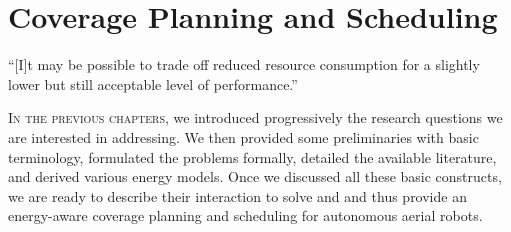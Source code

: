 
%
%
%
%
\chapter{Coverage Planning and Scheduling}
\label{cp:dyn}

\begin{chapquote}{\cite{lahijanian2018resource}}
  ``[I]t may be possible to trade off reduced resource consumption for a slightly lower but still acceptable level of performance.''
\end{chapquote}

\vspace*{1em}

\lettrine{I}{n the previous chapters}, we introduced progressively the research questions we are interested in addressing. We then provided some preliminaries with basic terminology, formulated the problems formally, detailed the available literature, and derived various energy models. Once we discussed all these basic constructs, we are ready to describe their interaction to solve  and  and thus provide an energy-aware coverage planning and scheduling for autonomous aerial robots.

